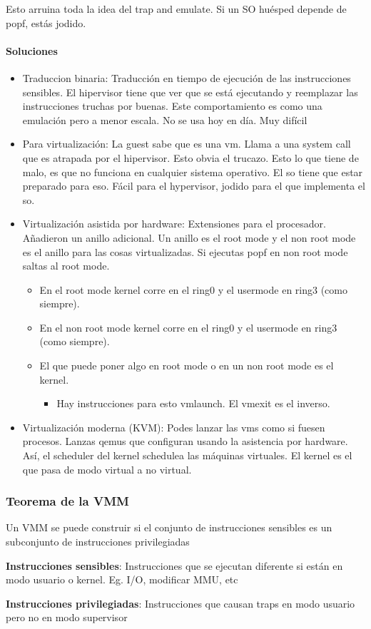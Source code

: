 \documentclass{article}
\begin{document}
Esto arruina toda la idea del trap and emulate. Si un SO huésped depende
de popf, estás jodido.

\paragraph{Soluciones}\label{soluciones}

\begin{itemize}
\item
  Traduccion binaria: Traducción en tiempo de ejecución de las
  instrucciones sensibles. El hipervisor tiene que ver que se está
  ejecutando y reemplazar las instrucciones truchas por buenas. Este
  comportamiento es como una emulación pero a menor escala. No se usa
  hoy en día. Muy difícil
\item
  Para virtualización: La guest sabe que es una vm. Llama a una system
  call que es atrapada por el hipervisor. Esto obvia el trucazo. Esto lo
  que tiene de malo, es que no funciona en cualquier sistema operativo.
  El so tiene que estar preparado para eso. Fácil para el hypervisor,
  jodido para el que implementa el so.
\item
  Virtualización asistida por hardware: Extensiones para el procesador.
  Añadieron un anillo adicional. Un anillo es el root mode y el non root
  mode es el anillo para las cosas virtualizadas. Si ejecutas popf en
  non root mode saltas al root mode.

  \begin{itemize}
  \item
    En el root mode kernel corre en el ring0 y el usermode en ring3
    (como siempre).
  \item
    En el non root mode kernel corre en el ring0 y el usermode en ring3
    (como siempre).
  \item
    El que puede poner algo en root mode o en un non root mode es el
    kernel.

    \begin{itemize}
    \item
      Hay instrucciones para esto vmlaunch. El vmexit es el inverso.
    \end{itemize}
  \end{itemize}
\item
  Virtualización moderna (KVM): Podes lanzar las vms como si fuesen
  procesos. Lanzas qemus que configuran usando la asistencia por
  hardware. Así, el scheduler del kernel schedulea las máquinas
  virtuales. El kernel es el que pasa de modo virtual a no virtual.
\end{itemize}

\subsubsection{Teorema de la VMM}\label{teorema-de-la-vmm}

Un VMM se puede construir si el conjunto de instrucciones sensibles es
un subconjunto de instrucciones privilegiadas

\textbf{Instrucciones sensibles}: Instrucciones que se ejecutan
diferente si están en modo usuario o kernel. Eg. I/O, modificar MMU, etc

\textbf{Instrucciones privilegiadas}: Instrucciones que causan traps en
modo usuario pero no en modo supervisor
\end{document}
